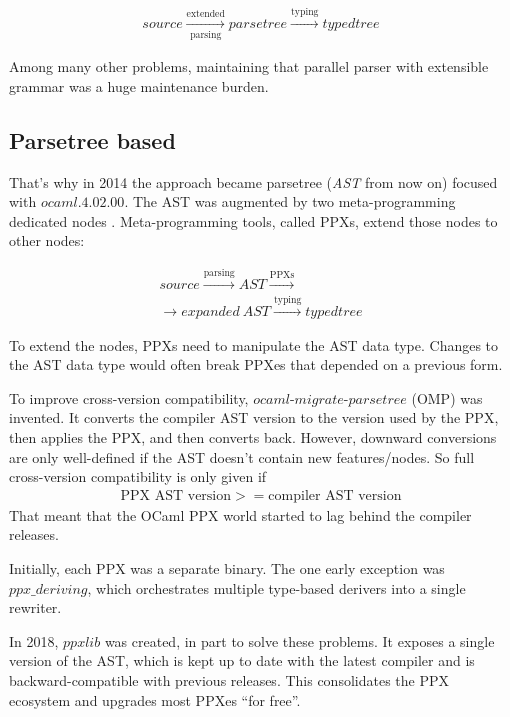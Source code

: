 \documentclass[10pt, a4paper, twocolumn]{article}
\begin{document}
\begin{align*}
source \xrightarrow[\text{parsing}]{\text{extended}} parsetree \xrightarrow{\text{typing}} typedtree
\end{align*}

Among many other problems, maintaining that parallel parser with extensible
grammar was a huge maintenance burden.


\subsection{Parsetree based}

That's why in 2014 the approach became parsetree (\emph{AST} from now on)
focused with $ocaml.4.02.00$. The AST was augmented by two meta-programming
dedicated nodes \cite{extension_nodes}\cite{attributes}. Meta-programming tools,
called PPXs, extend those nodes to other nodes:

\begin{gather*}
source \xrightarrow{\text{parsing}} AST \xrightarrow{\text{PPXs}}\\
\rightarrow expanded\ AST\xrightarrow{\text{typing}} typedtree
\end{gather*}

To extend the nodes, PPXs need to manipulate the AST data type. Changes to the
AST data type would often break PPXes that depended on a previous form.

To improve cross-version compatibility, $ocaml\mbox{-}migrate\mbox{-}parsetree$
(OMP)\cite{omp} was invented. It converts the compiler AST version to the
version used by the PPX, then applies the PPX, and then converts back. However,
downward conversions are only well-defined if the AST doesn't contain new
features/nodes. So full cross-version compatibility is only given if
\begin{align*}
\text{PPX\ AST\ version} >= \text{compiler\ AST\ version}
\end{align*}
That meant that the OCaml PPX world started to lag behind the compiler releases.

Initially, each PPX was a separate binary. The one early exception was $ppx \_
deriving$, which orchestrates multiple type-based derivers into a single
rewriter.

In 2018, $ppxlib$\cite{ppxlib} was created, in part to solve these problems. It
exposes a single version of the AST, which is kept up to date with the latest
compiler and is backward-compatible with previous releases. This consolidates
the PPX ecosystem and upgrades most PPXes ``for free''.
\end{document}
